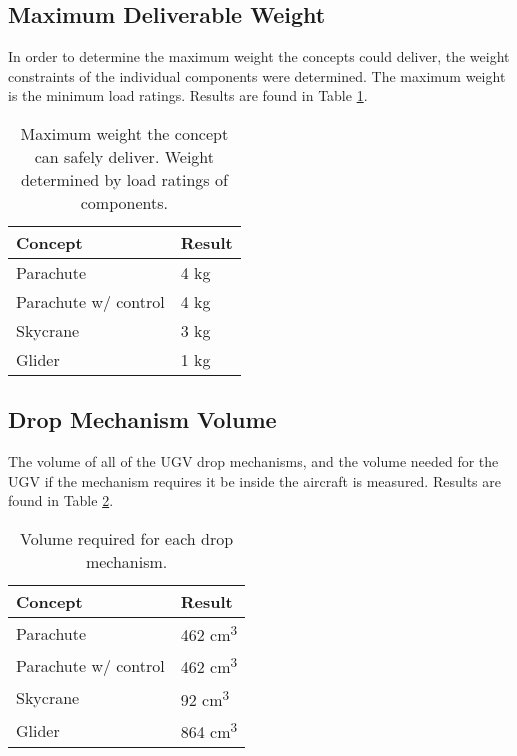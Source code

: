 \documentclass[]{auvsi_doc}
\begin{document}
	\subsection{Maximum Deliverable Weight}

	
	In order to determine the maximum weight the concepts could deliver, the weight constraints of the individual components were determined. The maximum weight is the minimum load ratings. Results are found in Table \ref{weight}.



	\begin{table}[!h]
\centering

\caption{Maximum weight the concept can safely deliver. Weight determined by load ratings of components.}
\label{weight}
	\begin{tabular}{|l|l|}
		\hline
		\rowcolor[HTML]{C0C0C0}
		\textbf{Concept}       & \textbf{Result} \\
		\hline
		Parachute              &         4 kg        \\
		Parachute w/ control   &          4 kg       \\
		Skycrane               &        3 kg         \\
		Glider                 & 		1 kg	 \\
		\hline
	\end{tabular}
	\end{table}

	\subsection{Drop Mechanism Volume}

	The volume of all of the UGV drop mechanisms, and the volume needed for the UGV if the mechanism requires it be inside the aircraft is measured. Results are found in Table \ref{volume}.


	\begin{table}[!h]
\centering

\caption{Volume required for each drop mechanism.}
\label{volume}
	\begin{tabular}{|l|l|}
		\hline
		\rowcolor[HTML]{C0C0C0}
		\textbf{Concept}       & \textbf{Result} \\
		\hline
		Parachute              &        462 cm\textsuperscript{3}         \\
		Parachute w/ control   &    462 cm\textsuperscript{3}             \\
		Skycrane               &          92 cm\textsuperscript{3}       \\
		Glider                 & 		864 cm\textsuperscript{3}	 \\
		\hline
	\end{tabular}
	\end{table}
\end{document}

